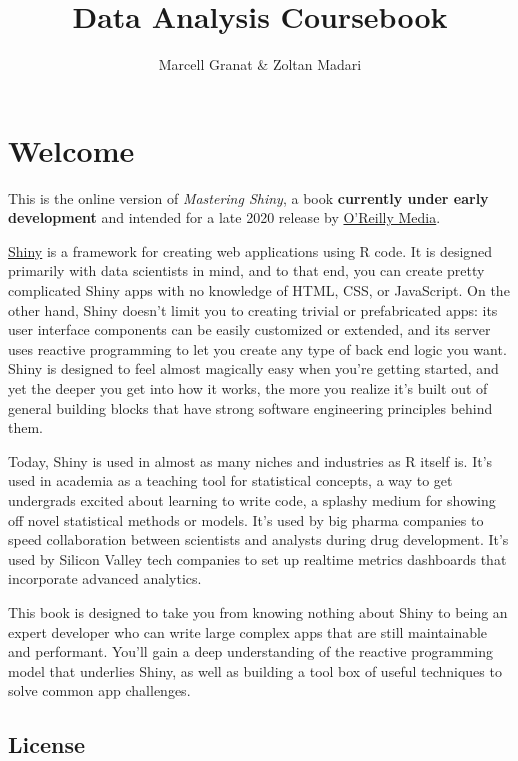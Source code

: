 \documentclass[
]{article}
\title{Data Analysis Coursebook}
\author{Marcell Granat \& Zoltan Madari}
\date{}
\begin{document}
\maketitle

{
\setcounter{tocdepth}{2}
\tableofcontents
}
\pagebreak

\hypertarget{welcome}{%
\section*{Welcome}\label{welcome}}

This is the online version of \emph{Mastering Shiny}, a book \textbf{currently under early development} and intended for a late 2020 release by \href{https://www.oreilly.com/}{O'Reilly Media}.

\href{https://shiny.rstudio.com/}{Shiny} is a framework for creating web applications using R code.
It is designed primarily with data scientists in mind, and to that end, you can create pretty complicated Shiny apps with no knowledge of HTML, CSS, or JavaScript.
On the other hand, Shiny doesn't limit you to creating trivial or prefabricated apps: its user interface components can be easily customized or extended, and its server uses reactive programming to let you create any type of back end logic you want.
Shiny is designed to feel almost magically easy when you're getting started, and yet the deeper you get into how it works, the more you realize it's built out of general building blocks that have strong software engineering principles behind them.

Today, Shiny is used in almost as many niches and industries as R itself is.
It's used in academia as a teaching tool for statistical concepts, a way to get undergrads excited about learning to write code, a splashy medium for showing off novel statistical methods or models.
It's used by big pharma companies to speed collaboration between scientists and analysts during drug development.
It's used by Silicon Valley tech companies to set up realtime metrics dashboards that incorporate advanced analytics.

This book is designed to take you from knowing nothing about Shiny to being an expert developer who can write large complex apps that are still maintainable and performant.
You'll gain a deep understanding of the reactive programming model that underlies Shiny, as well as building a tool box of useful techniques to solve common app challenges.

\hypertarget{license}{%
\subsection*{License}\label{license}}
\end{document}
